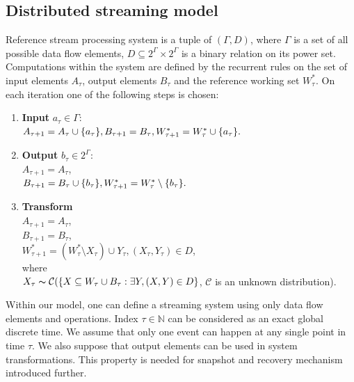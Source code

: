 \label{fs-formalism}

\subsection{Distributed streaming model}

\begin{definition}{Reference stream processing system}
\label{reference_system}
is a tuple of $(\Gamma,D)$, where $\Gamma$ is a set of all possible data flow elements, $D\subseteq{2^{\Gamma}\times2^{\Gamma}}$ is a binary relation on its power set. Computations within the system are defined by the recurrent rules on the set of input elements $A_\tau$, output elements $B_\tau$ and the reference working set $W^{*}_\tau$. On each iteration one of the following steps is chosen:

\begin{enumerate}
    \item \textbf{Input} $a_\tau\in{\Gamma}$:\\ $A_{\tau+1}=A_\tau \cup \{a_\tau\}, \\ B_{\tau+1}=B_{\tau}, \\ W^{*}_{\tau+1}=W^{*}_{\tau} \cup \{a_\tau\}.$
    \item \textbf{Output} $b_\tau\in{2^\Gamma}$:\\ $A_{\tau + 1} = A_{\tau}$, \\ $B_{\tau+1}=B_\tau \cup \{b_\tau\}, \\ W^{*}_{\tau+1}=W^{*}_{\tau} \setminus \{b_\tau\}.$
    \item \textbf{Transform}\\ $A_{\tau + 1} = A_{\tau}$,\\ $B_{\tau+1}=B_{\tau}$, \\ $W^{*}_{\tau+1}=(W^{*}_\tau \setminus X_\tau) \cup Y_\tau, (X_\tau,Y_\tau) \in D$, \\where\\$X_\tau \thicksim \mathcal{C}(\{X \subseteq W_\tau \cup B_\tau : \exists Y, (X,Y) \in D \}$, $\mathcal{C}$ is an unknown distribution). \label{random_formula}
\end{enumerate}

\end{definition}

Within our model, one can define a streaming system using only data flow elements and operations. Index $\tau\in{\mathbb{N}}$ can be considered as an exact global discrete time. We assume that only one event can happen at any single point in time $\tau$. We also suppose that output elements can be used in system transformations. This property is needed for snapshot and recovery mechanism introduced further. 

